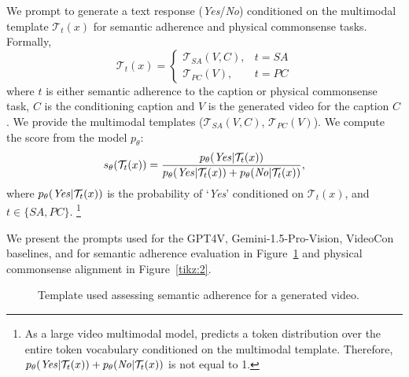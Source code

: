We prompt \videocon{} to generate a text response (\textit{Yes}/\textit{No}) conditioned on the multimodal template $\mathcal{T}_{t}(x)$ for semantic adherence and physical commonsense tasks. Formally, 
\begin{equation}
    \mathcal{T}_{t}(x) = \begin{cases} 
      \mathcal{T}_{SA}(V, C), & t = SA \\
     \mathcal{T}_{PC}(V), & t = PC 
   \end{cases}
\end{equation}
where $t$ is either semantic adherence to the caption or physical commonsense task, $C$ is the conditioning caption and $V$ is the generated video for the caption $C$. We provide the multimodal templates ($\mathcal{T}_{SA}(V, C)$, $ \mathcal{T}_{PC}(V)$). We compute the score from the \videocon{} model $p_\theta$:
\begin{equation}
s_\theta(\mathcal{T}_t(x)) = \frac{p_\theta(\text{\textit{Yes}} | \mathcal{T}_t(x))}{p_\theta(\text{\textit{Yes}}| \mathcal{T}_t(x)) + p_\theta(\text{\textit{No}} | \mathcal{T}_t(x))},
\end{equation}
where $p_\theta(\text{\textit{Yes}}|\mathcal{T}_t(x))$ is the probability of `\textit{Yes}' conditioned on $\mathcal{T}_t(x)$, and $t \in \{SA, PC\}$. \footnote{As a large video multimodal model, \videocon{} predicts a token distribution over the entire token vocabulary conditioned on the multimodal template. Therefore, $p_\theta(\text{\textit{Yes}}| \mathcal{T}_t(x)) + p_\theta(\text{\textit{No}} | \mathcal{T}_t(x))$ is not equal to 1.}  

We present the prompts used for the GPT4V, Gemini-1.5-Pro-Vision, VideoCon baselines, and \model{} for semantic adherence evaluation in Figure~\ref{tikz:1} and physical commonsense alignment in Figure~\ref{tikz:2}.

\begin{figure}[h]
\centering
{}
\caption{Template used assessing semantic adherence for a generated video.}
\label{tikz:1}
\end{figure}


